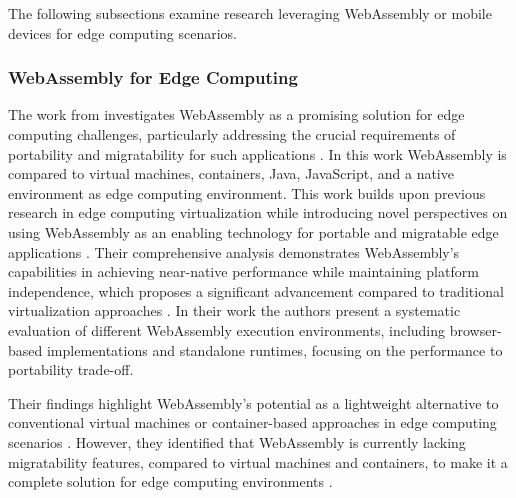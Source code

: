 The following subsections examine research leveraging WebAssembly or mobile devices for edge computing scenarios.

\subsubsection{WebAssembly for Edge Computing}
\label{subsec:background:related_work:wasmedgecomputing}
The work from \citeauthor{relatedwork:wasmedgecomputing} \cite{relatedwork:wasmedgecomputing} investigates WebAssembly as a promising solution for edge computing challenges, particularly addressing the crucial requirements of portability and migratability for such applications \cite{relatedwork:wasmedgecomputing}. In this work WebAssembly is compared to virtual machines, containers, Java, JavaScript, and a native environment as edge computing environment. This work builds upon previous research in edge computing virtualization while introducing novel perspectives on using WebAssembly as an enabling technology for portable and migratable edge applications \cite{relatedwork:wasmedgecomputing}. Their comprehensive analysis demonstrates WebAssembly's capabilities in achieving near-native performance while maintaining platform independence, which proposes a significant advancement compared to traditional virtualization approaches \cite{relatedwork:wasmedgecomputing}. In their work the authors present a systematic evaluation of different WebAssembly execution environments, including browser-based implementations and standalone runtimes, focusing on the performance to portability trade-off.

Their findings highlight WebAssembly's potential as a lightweight alternative to conventional virtual machines or container-based approaches in edge computing scenarios \cite{relatedwork:wasmedgecomputing}. However, they identified that WebAssembly is currently lacking migratability features, compared to virtual machines and containers, to make it a complete solution for edge computing environments \cite{relatedwork:wasmedgecomputing}. 


